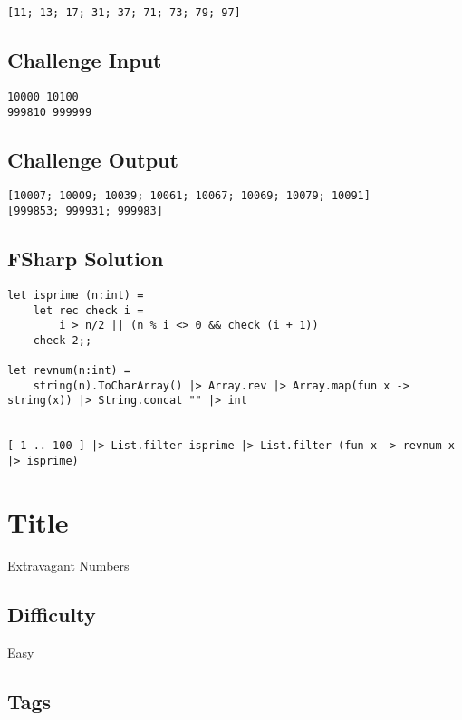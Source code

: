 \begin{verbatim}
[11; 13; 17; 31; 37; 71; 73; 79; 97]
\end{verbatim}

\subsection{Challenge Input}\label{challenge-input-17}

\begin{verbatim}
10000 10100
999810 999999
\end{verbatim}

\subsection{Challenge Output}\label{challenge-output-14}

\begin{verbatim}
[10007; 10009; 10039; 10061; 10067; 10069; 10079; 10091]
[999853; 999931; 999983]
\end{verbatim}

\subsection{FSharp Solution}\label{fsharp-solution-1}

\begin{verbatim}
let isprime (n:int) =
    let rec check i =
        i > n/2 || (n % i <> 0 && check (i + 1))
    check 2;;

let revnum(n:int) = 
    string(n).ToCharArray() |> Array.rev |> Array.map(fun x -> string(x)) |> String.concat "" |> int


[ 1 .. 100 ] |> List.filter isprime |> List.filter (fun x -> revnum x |> isprime)
\end{verbatim}

\section{Title}\label{title-24}

Extravagant Numbers

\subsection{Difficulty}\label{difficulty-23}

Easy

\subsection{Tags}\label{tags-24}

